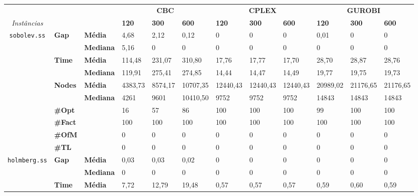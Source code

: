 
\begin{table}[]
	\begin{footnotesize}
	\begin{adjustbox}{angle=90}
	\begin{tabular}{c@{\hskip 0.2cm}l@{\hskip 0.1cm}l|lll|lll|lll}
	& & & \multicolumn{3}{c}{\textbf{CBC}} & \multicolumn{3}{c}{\textbf{CPLEX}} & \multicolumn{3}{c}{\textbf{GUROBI}} 	\\\textit{Instâncias} & & & \textbf{120} & \textbf{300} & \textbf{600} & \textbf{120} & \textbf{300} & \textbf{600} & \textbf{120} & \textbf{300} & \textbf{600} \\
\hline
\multirow{7}{*}{\texttt{sobolev.ss}} & \multirow{2}{*}{\textbf{Gap}} & \textbf{Média} & 4,68 & 2,12 & 0,12 & 0 & 0 & 0 & 0,01 & 0 & 0 \\
 & & \textbf{Mediana} & 5,16 & 0 & 0 & 0 & 0 & 0 & 0 & 0 & 0 \\
\cline{2-12}
 & \multirow{2}{*}{\textbf{Time}} & \textbf{Média} & 114,48 & 231,07 & 310,80 & 17,76 & 17,77 & 17,70 & 28,70 & 28,87 & 28,76 \\
 & & \textbf{Mediana} & 119,91 & 275,41 & 274,85 & 14,44 & 14,47 & 14,49 & 19,77 & 19,75 & 19,73 \\
\cline{2-12}
 & \multirow{2}{*}{\textbf{Nodes}} & \textbf{Média} & 4383,73 & 8574,17 & 10707,35 & 12440,43 & 12440,43 & 12440,43 & 20989,02 & 21176,65 & 21176,65 \\
 & & \textbf{Mediana} & 4261 & 9601 & 10410,50 & 9752 & 9752 & 9752 & 14843 & 14843 & 14843 \\
\cline{2-12}
 & \textbf{\#Opt} & & 16 & 57 & 86 & 100 & 100 & 100 & 99 & 100 & 100 \\
 & \textbf{\#Fact} & & 100 & 100 & 100 & 100 & 100 & 100 & 100 & 100 & 100 \\
 & \textbf{\#OfM} & & 0 & 0 & 0 & 0 & 0 & 0 & 0 & 0 & 0 \\
 & \textbf{\#TL} & & 0 & 0 & 0 & 0 & 0 & 0 & 0 & 0 & 0 \\
\hline
\multirow{7}{*}{\texttt{holmberg.ss}} & \multirow{2}{*}{\textbf{Gap}} & \textbf{Média} & 0,03 & 0,03 & 0,02 & 0 & 0 & 0 & 0 & 0 & 0 \\
 & & \textbf{Mediana} & 0 & 0 & 0 & 0 & 0 & 0 & 0 & 0 & 0 \\
\cline{2-12}
 & \multirow{2}{*}{\textbf{Time}} & \textbf{Média} & 7,72 & 12,79 & 19,48 & 0,57 & 0,57 & 0,57 & 0,59 & 0,60 & 0,59 \\

\end{tabular}
\end{adjustbox}
\end{footnotesize}
\end{table}
